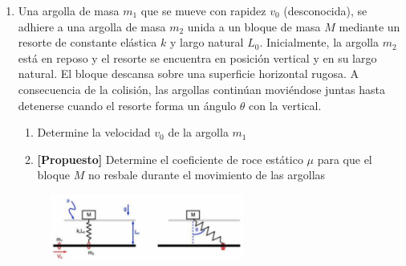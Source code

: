 \documentclass[letterpaper,11pt]{article}
\begin{document}
\begin{enumerate}
\newpage

\item Una argolla de masa $m_1$ que se mueve con rapidez $v_0$ (desconocida), se adhiere a una argolla de masa $m_2$ unida a un bloque de masa $M$ mediante un resorte de constante elástica $k$ y largo natural $L_0$. Inicialmente, la argolla $m_2$ está en reposo y el resorte se encuentra en posición vertical y en su largo natural. El bloque descansa sobre una superficie horizontal rugosa. A consecuencia de la colisión, las argollas continúan moviéndose juntas hasta detenerse cuando el resorte forma un ángulo $\theta$ con la vertical.
    

\begin{enumerate}
    \item Determine la velocidad $v_0$ de la argolla $m_1$
    \item \textbf{[Propuesto]} Determine el coeficiente de roce estático $\mu$ para que el bloque $M$ no resbale durante el movimiento de las argollas 
\end{enumerate}
    
\begin{figure}[H]
    \centering
    \includegraphics[width=0.6\textwidth]{2021-2/img/aux11/aa.PNG}
\end{figure}



%   

\end{enumerate}
\end{document}
